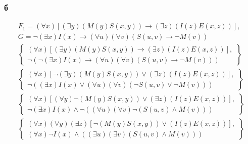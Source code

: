 \documentclass[12pt]{article}
\begin{document}
\subsubsection{б}
\begin{gather*}
  F_1 = \left(\forall x\right)\left[\left(\exists y\right)\left(M(y)S(x,y)\right) \rightarrow \left(\exists z\right)\left(I(z)E(x,z)\right)\right], \\
  G = \neg \left(\exists x\right)I(x)\rightarrow \left(\forall u\right)\left(\forall v\right)\left(S(u, v) \rightarrow \neg M(v)\right) \\
  \left\{
    \begin{array}{c}
  \left(\forall x\right)\left[\left(\exists y\right)\left(M(y)S(x,y)\right) \rightarrow \left(\exists z\right)\left(I(z)E(x,z)\right)\right], \\
  \neg \left(\neg \left(\exists x\right)I(x)\rightarrow \left(\forall u\right)\left(\forall v\right)\left(S(u, v) \rightarrow \neg M(v)\right)\right)
    \end{array}
  \right\} \\
  \left\{
    \begin{array}{c}
  \left(\forall x\right)\left[\neg\left(\exists y\right)\left(M(y)S(x,y)\right) \vee \left(\exists z\right)\left(I(z)E(x,z)\right)\right], \\
    \neg \left(\left(\exists x\right)I(x)\vee \left(\forall u\right)\left(\forall v\right)\left(\neg S(u, v) \vee \neg M(v)\right)\right)
    \end{array}
  \right\} \\
  \left\{
    \begin{array}{c}
      \left(\forall x\right)\left[\left(\forall y\right)\neg\left(M(y)S(x,y)\right) \vee \left(\exists z\right)\left(I(z)E(x,z)\right)\right], \\
    \neg\left(\exists x\right)I(x)\wedge \neg\left(\left(\forall u\right)\left(\forall v\right)\neg\left(S(u, v) \wedge M(v)\right)\right)
    \end{array}
  \right\} \\
  \left\{
    \begin{array}{c}
      \left(\forall x\right)\left(\forall y\right)\left(\exists z\right)\left[\neg\left(M(y)S(x,y)\right) \vee \left(I(z)E(x,z)\right)\right], \\
      \left(\forall x\right)\neg I(x)\wedge \left(\left(\exists u\right)\left(\exists v\right)\left(S(u, v) \wedge M(v)\right)\right)
    \end{array}
  \right\} \\

\end{gather*}
\end{document}
